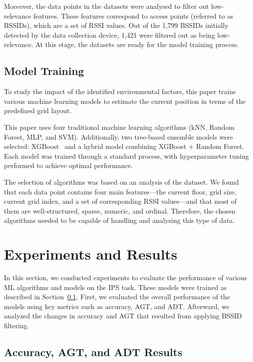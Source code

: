 \documentclass[runningheads]{llncs}
\begin{document}
Moreover, the data points in the datasets were analysed to filter out low-relevance features. These features correspond to access points (referred to as BSSIDs), which are a set of RSSI values. Out of the 1,799 BSSIDs initially detected by the data collection device, 1,421 were filtered out as being low-relevance. At this stage, the datasets are ready for the model training process.

\subsection{Model Training}\label{ssec:training}

To study the impact of the identified environmental factors, this paper trains various machine learning models to estimate the current position in terms of the predefined grid layout.

This paper uses four traditional machine learning algorithms (kNN, Random Forest, MLP, and SVM). Additionally, two tree-based ensemble models were selected: XGBoost~\cite{add2} and a hybrid model combining XGBoost + Random Forest. Each model was trained through a standard process, with hyperparameter tuning performed to achieve optimal performance.

The selection of algorithms was based on an analysis of the dataset. We found that each data point contains four main features—the current floor, grid size, current grid index, and a set of corresponding RSSI values—and that most of them are well-structured, sparse, numeric, and ordinal. Therefore, the chosen algorithms needed to be capable of handling and analysing this type of data.


\section{Experiments and Results}\label{sec:experiment-results}

In this section, we conducted experiments to evaluate the performance of various ML algorithms and models on the IPS task. These models were trained as described in Section~\ref{ssec:training}. First, we evaluated the overall performance of the models using key metrics such as accuracy, AGT, and ADT. Afterward, we analyzed the changes in accuracy and AGT that resulted from applying BSSID filtering.

\subsection{Accuracy, AGT, and ADT Results}\label{ssec:acc-agt-adt-results}
\end{document}
